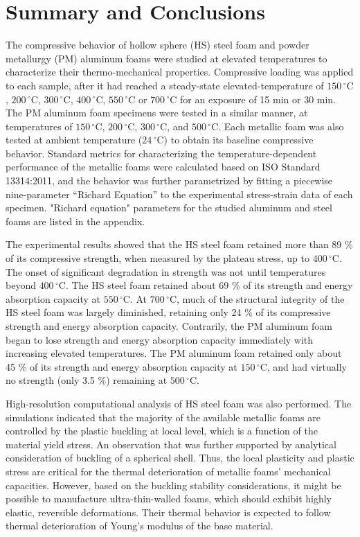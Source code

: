 \documentclass[review]{elsarticle}
\begin{document}
\section{Summary and Conclusions}

The compressive behavior of hollow sphere (HS) steel foam and powder metallurgy (PM) aluminum foams were studied at elevated temperatures to characterize their thermo-mechanical properties. Compressive loading was applied to each sample, after it had reached a steady-state elevated-temperature of $150\,^{\circ}\mathrm{C}$, $200\,^{\circ}\mathrm{C}$, $300\,^{\circ}\mathrm{C}$, $400\,^{\circ}\mathrm{C}$, $550\,^{\circ}\mathrm{C}$ or $700\,^{\circ}\mathrm{C}$ for an exposure of 15 min or 30 min. The PM aluminum foam specimens were tested in a similar manner, at temperatures of $150\,^{\circ}\mathrm{C}$, $200\,^{\circ}\mathrm{C}$, $300\,^{\circ}\mathrm{C}$, and $500\,^{\circ}\mathrm{C}$. Each metallic foam was also tested at ambient temperature ($24\,^{\circ}\mathrm{C}$) to obtain its baseline compressive behavior. Standard metrics for characterizing the temperature-dependent performance of the metallic foams were calculated based on ISO Standard 13314:2011, and the behavior was further parametrized by fitting a piecewise nine-parameter “Richard Equation” to the experimental stress-strain data of each specimen. "Richard equation" parameters for the studied aluminum and steel foams are listed in the appendix.

The experimental results showed that the HS steel foam retained more than 89 \% of its compressive strength, when measured by the plateau stress, up to $400\,^{\circ}\mathrm{C}$. The onset of significant degradation in strength was not until temperatures beyond $400\,^{\circ}\mathrm{C}$. The HS steel foam retained about 69 \% of its strength and energy absorption capacity at $550\,^{\circ}\mathrm{C}$. At $700\,^{\circ}\mathrm{C}$, much of the structural integrity of the HS steel foam was largely diminished, retaining only 24 \% of its compressive strength and energy absorption capacity. Contrarily, the PM aluminum foam began to lose strength and energy absorption capacity immediately with increasing elevated temperatures. The PM aluminum foam retained only about 45 \% of its strength and energy absorption capacity at $150\,^{\circ}\mathrm{C}$, and had virtually no strength (only 3.5 \%) remaining at $500\,^{\circ}\mathrm{C}$.

High-resolution computational analysis of HS steel foam was also performed. The simulations indicated that the majority of the available metallic foams are controlled by the plastic buckling at local level, which is a function of the material yield stress. An observation that was further supported by analytical consideration of buckling of a spherical shell. Thus, the local plasticity and plastic stress are critical for the thermal deterioration of metallic foams’ mechanical capacities. However, based on the buckling stability considerations, it might be possible to manufacture ultra-thin-walled foams, which should exhibit highly elastic, reversible deformations. Their thermal behavior is expected to follow thermal deterioration of Young's modulus of the base material.
\end{document}

